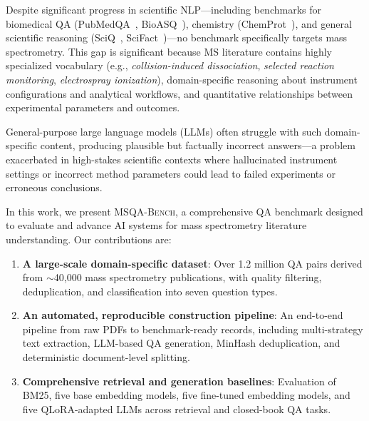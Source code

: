 \documentclass[11pt]{article}
\newcommand{\msqa}{\textsc{MSQA-Bench}}
\begin{document}
Despite significant progress in scientific NLP---including benchmarks for biomedical QA (PubMedQA~\citep{jin2019pubmedqa}, BioASQ~\citep{tsatsaronis2015overview}), chemistry (ChemProt~\citep{taboureau2011chemprot}), and general scientific reasoning (SciQ~\citep{welbl2017crowdsourcing}, SciFact~\citep{wadden2020fact})---no benchmark specifically targets mass spectrometry. This gap is significant because MS literature contains highly specialized vocabulary (e.g., \textit{collision-induced dissociation}, \textit{selected reaction monitoring}, \textit{electrospray ionization}), domain-specific reasoning about instrument configurations and analytical workflows, and quantitative relationships between experimental parameters and outcomes.

General-purpose large language models (LLMs) often struggle with such domain-specific content, producing plausible but factually incorrect answers---a problem exacerbated in high-stakes scientific contexts where hallucinated instrument settings or incorrect method parameters could lead to failed experiments or erroneous conclusions.

In this work, we present \msqa{}, a comprehensive QA benchmark designed to evaluate and advance AI systems for mass spectrometry literature understanding. Our contributions are:

\begin{enumerate}[leftmargin=*,itemsep=2pt]
    \item \textbf{A large-scale domain-specific dataset}: Over 1.2 million QA pairs derived from $\sim$40,000 mass spectrometry publications, with quality filtering, deduplication, and classification into seven question types.

    \item \textbf{An automated, reproducible construction pipeline}: An end-to-end pipeline from raw PDFs to benchmark-ready records, including multi-strategy text extraction, LLM-based QA generation, MinHash deduplication, and deterministic document-level splitting.

    \item \textbf{Comprehensive retrieval and generation baselines}: Evaluation of BM25, five base embedding models, five fine-tuned embedding models, and five QLoRA-adapted LLMs across retrieval and closed-book QA tasks.
\end{enumerate}

\end{document}
